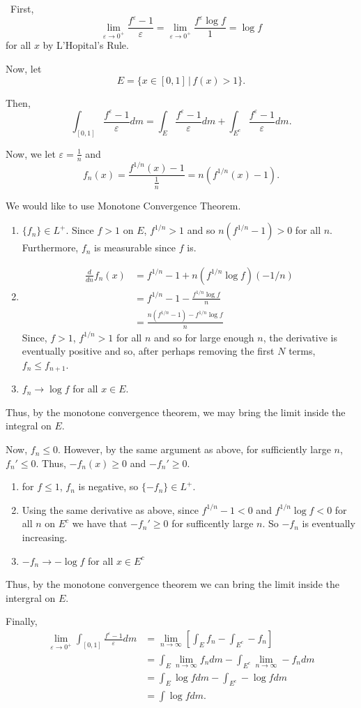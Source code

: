 \documentclass[12pt]{Homework}
\begin{document}
\begin{solution}$\,$
First, $$\lim_{\varepsilon\to0^+}\frac{f^\varepsilon-1}{\varepsilon}=\lim_{\varepsilon\to0^+}\frac{f^\varepsilon\log f}{1}=\log f$$ for all $x$ by L'Hopital's Rule.

Now, let $$E=\{x\in[0,1]\,|\,f(x)>1\}.$$

Then, $$\int_{[0,1]}\frac{f^\varepsilon-1}{\varepsilon}dm=\int_{E}\frac{f^\varepsilon-1}{\varepsilon}dm+\int_{E^c}\frac{f^\varepsilon-1}{\varepsilon}dm.$$

Now, we let $\varepsilon=\frac{1}{n}$ and $$f_n(x)=\frac{f^{1/n}(x)-1}{\frac{1}{n}}=n(f^{1/n}(x)-1).$$

 We would like to use Monotone Convergence Theorem. 
\begin{enumerate}
    \item $\{f_n\}\in L^+$. Since $f>1$ on $E$, $f^{1/n}>1$ and so $n(f^{1/n}-1)>0$ for all $n$. Furthermore, $f_n$ is measurable since $f$ is.
    \item \begin{align*}
        \frac{d}{dn}f_n(x)&=f^{1/n}-1+n(f^{1/n}\log f)(-1/n)\\
        &=f^{1/n}-1-\frac{f^{1/n}\log f}{n}\\
        &=\frac{n(f^{1/n}-1)-f^{1/n}\log f}{n}
    \end{align*}
    Since, $f>1$, $f^{1/n}>1$ for all $n$ and so for large enough $n$, the derivative is eventually positive and so, after perhaps removing the first $N$ terms, $f_n\le f_{n+1}$. 
    \item $f_n\to\log f$ for all $x\in E$.
\end{enumerate}

Thus, by the monotone convergence theorem, we may bring the limit inside the integral on $E$.

 Now, $f_n\le 0$. However, by the same argument as above, for sufficiently large $n$, $f_n'\le0$. Thus, $-f_n(x)\ge0$ and $-f_n'\ge 0$.
\begin{enumerate}
    \item for $f\le 1$, $f_n$ is negative, so $\{-f_n\}\in L^+$.
    \item Using the same derivative as above, since $f^{1/n}-1<0$ and $f^{1/n}\log f<0$ for all $n$ on $E^c$ we have that $-f_n'\ge0$ for sufficently large $n$. So $-f_n$ is eventually increasing.
    \item $-f_n\to -\log f$ for all $x\in E^c$
\end{enumerate}

Thus, by the monotone convergence theorem we can bring the limit inside the intergral on $E$.

Finally, 
\begin{align*}
    \lim_{\varepsilon\to0^+}\int_{[0,1]}\frac{f^\varepsilon-1}{\varepsilon}dm&=\lim_{n\to\infty}\left[\int_Ef_n-\int_{E^c}-f_n\right]\\
    &=\int_E\lim_{n\to\infty}f_ndm-\int_{E^c}\lim_{n\to\infty}-f_ndm\\
    &=\int_E\log fdm-\int_{E^c}-\log fdm\\
    &=\int\log fdm.
\end{align*}

\end{solution}
\end{document}
